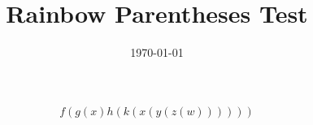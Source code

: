 \documentclass[a4paper]{article} %
\title{Rainbow Parentheses Test}
\date{\today}
\begin{document}
\maketitle


\begin{cps}
    \[f(g(x)h(k(x(y(z(w))))))\]
\end{cps}

%
%
\end{document}
